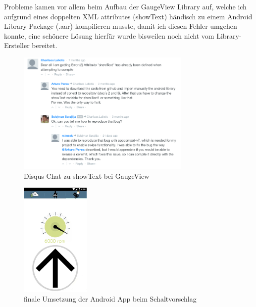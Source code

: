 Probleme kamen vor allem beim Aufbau der GaugeView Library auf, welche ich aufgrund eines doppelten XML attributes (showText) händisch zu einem Android Library Package (.aar) kompilieren musste, damit ich diesen Fehler umgehen konnte, eine schönere Lösung hierfür wurde bisweilen noch nicht vom Library-Ersteller bereitet. 
\begin{figure}[!htb]\centering
		\includegraphics[width=0.75\textwidth]{images/gaugeViewShowText}
		\caption{Disqus Chat zu showText bei GaugeView} \label{fig:imgGaugeViewDisqus}
\end{figure}



\begin{figure}[!htb]\centering
		\includegraphics[width=0.3\textwidth]{images/schalt}
		\caption{finale Umsetzung der Android App beim Schaltvorschlag} \label{fig:imgShiftAndroidFinished}
\end{figure}


\clearpage %